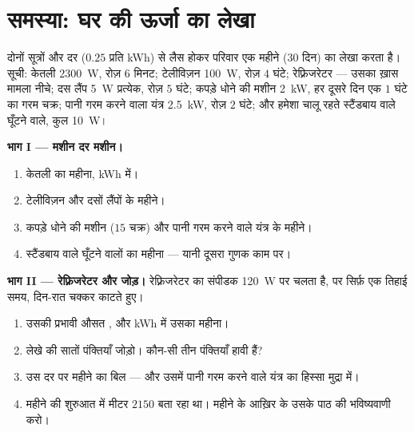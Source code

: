 \section{समस्या: घर की ऊर्जा का लेखा}

\begin{problem}\label{pb:g9:electric-power-energy:1}
दोनों सूत्रों और दर ($0.25$ प्रति \unit{kWh}) से लैस होकर परिवार एक
महीने (30 दिन) का लेखा करता है। सूची: केतली \qty{2300}{W}, रोज़ $6$
मिनट; टेलीविज़न \qty{100}{W}, रोज़ $4$ घंटे; रेफ़्रिजरेटर --- उसका
ख़ास मामला नीचे; दस लैंप \qty{5}{W} प्रत्येक, रोज़ $5$ घंटे; कपड़े
धोने की मशीन \qty{2}{kW}, हर दूसरे दिन एक $1$ घंटे का गरम चक्र; पानी
गरम करने वाला यंत्र \qty{2.5}{kW}, रोज़ $2$ घंटे; और हमेशा चालू रहते
स्टैंडबाय वाले घूँटने वाले, कुल \qty{10}{W}।

\medskip\noindent\textbf{भाग I --- मशीन दर मशीन।}
\begin{enumerate}
  \item केतली का महीना, \unit{kWh} में।
  \item टेलीविज़न और दसों लैंपों के महीने।
  \item कपड़े धोने की मशीन ($15$ चक्र) और पानी गरम करने वाले यंत्र के
        महीने।
  \item स्टैंडबाय वाले घूँटने वालों का महीना --- यानी दूसरा गुणक काम
        पर।
\end{enumerate}

\medskip\noindent\textbf{भाग II --- रेफ़्रिजरेटर और जोड़।}
रेफ़्रिजरेटर का संपीडक \qty{120}{W} पर चलता है, पर सिर्फ़ एक तिहाई
समय, दिन-रात चक्कर काटते हुए।
\begin{enumerate}[resume]
  \item उसकी प्रभावी औसत , और \unit{kWh} में उसका महीना।
  \item लेखे की सातों पंक्तियाँ जोड़ो। कौन-सी तीन पंक्तियाँ हावी हैं?
  \item उस दर पर महीने का बिल --- और उसमें पानी गरम करने वाले यंत्र का
        हिस्सा मुद्रा में।
  \item महीने की शुरुआत में मीटर $2150$  बता रहा था। महीने के
        आख़िर के उसके पाठ की भविष्यवाणी करो।
\end{enumerate}


\end{problem}
